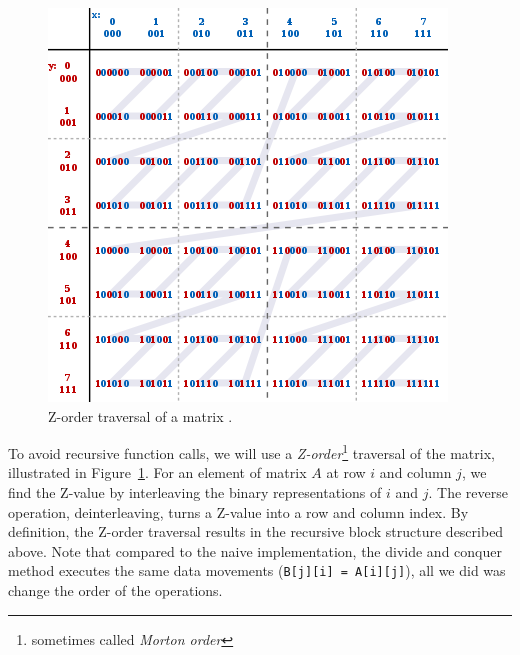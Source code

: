 \documentclass[a4paper,11pt, oneside]{report}
\newcommand{\code}[1]{\texttt{#1}}
\newcommand{\concept}[1]{\emph{#1}}
\begin{document}
\begin{figure}[hbt]
	\centering
	\includegraphics[width=0.8\columnwidth]{z-order.png}
	\caption{Z-order traversal of a matrix \cite{wiki-z-order}.} \label{fig:z-order}
\end{figure}
To avoid recursive function calls, we will use a \concept{Z-order}\footnote{sometimes called \concept{Morton order}} traversal of the matrix, illustrated in Figure~\ref{fig:z-order}. For an element of matrix $A$ at row $i$ and column $j$, we find the Z-value by interleaving the binary representations of $i$ and $j$. The reverse operation, deinterleaving, turns a Z-value into a row and column index. By definition, the Z-order traversal results in the recursive block structure described above. Note that compared to the naive implementation, the divide and conquer method executes the same data movements (\code{B[j][i] = A[i][j]}), all we did was change the order of the operations.

\end{document}
